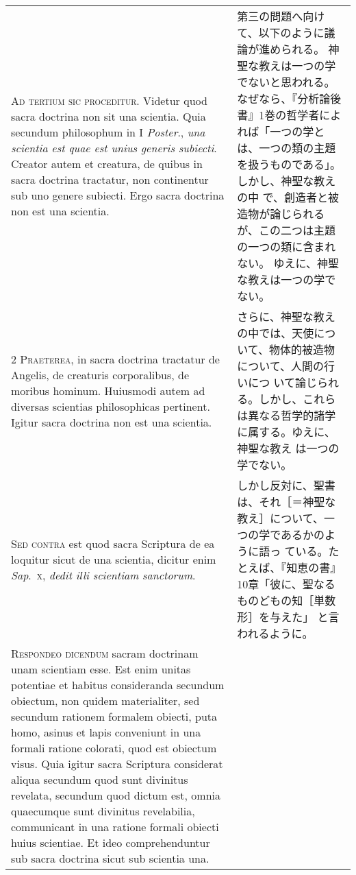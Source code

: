 \documentclass[10pt]{jsarticle} %
\begin{document}
\begin{longtable}{p{21em}p{21em}}

{\huge A}{\scshape d tertium sic proceditur}. Videtur quod sacra
doctrina non sit una scientia. Quia secundum philosophum in I {\itshape
Poster}., {\itshape una scientia est quae est unius generis
subiecti}. Creator autem et creatura, de quibus in sacra doctrina
tractatur, non continentur sub uno genere subiecti. Ergo sacra doctrina
non est una scientia.

&

第三の問題へ向けて、以下のように議論が進められる。
神聖な教えは一つの学でないと思われる。なぜなら、『分析論後書』1巻の哲学者によ
 れば「一つの学とは、一つの類の主題を扱うものである」。しかし、神聖な教えの中
 で、創造者と被造物が論じられるが、この二つは主題の一つの類に含まれない。
 ゆえに、神聖な教えは一つの学でない。

\\


{\scshape 2 Praeterea}, in sacra doctrina tractatur de
Angelis, de creaturis corporalibus, de moribus hominum. Huiusmodi autem
ad diversas scientias philosophicas pertinent. Igitur sacra doctrina non
est una scientia.


&

さらに、神聖な教えの中では、天使について、物体的被造物について、人間の行いにつ
 いて論じられる。しかし、これらは異なる哲学的諸学に属する。ゆえに、神聖な教え
 は一つの学でない。

\\


{\scshape Sed contra} est quod sacra Scriptura de ea loquitur sicut de
una scientia, dicitur enim {\itshape Sap}.~{\scshape x}, {\itshape dedit
illi scientiam sanctorum}.


&
しかし反対に、聖書は、それ［＝神聖な教え］について、一つの学であるかのように語っ
 ている。たとえば、『知恵の書』10章「彼に、聖なるものどもの知［単数形］を与えた」
 と言われるように。

\\


{\scshape Respondeo dicendum} sacram doctrinam unam
scientiam esse. Est enim unitas potentiae et habitus consideranda
secundum obiectum, non quidem materialiter, sed secundum rationem
formalem obiecti, puta homo, asinus et lapis conveniunt in una formali
ratione colorati, quod est obiectum visus. Quia igitur sacra Scriptura
considerat aliqua secundum quod sunt divinitus revelata, secundum quod
dictum est, omnia quaecumque sunt divinitus revelabilia, communicant in
una ratione formali obiecti huius scientiae. Et ideo comprehenduntur sub
sacra doctrina sicut sub scientia una.



\end{longtable}
\end{document}
